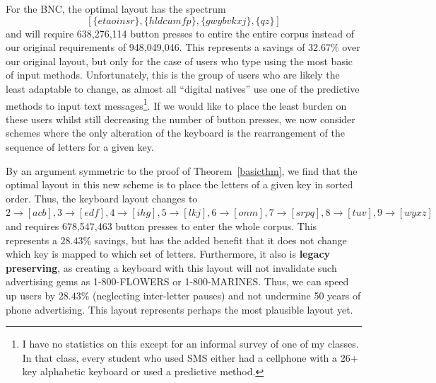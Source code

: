 \documentclass{article}
\newcommand{\newword}[1]{{\bf #1}}
\begin{document}
For the BNC, the optimal layout has the spectrum 
$$[\{etaoinsr\}, \{hldcumfp\}, \{gwybvkxj\}, \{qz\}]$$
and will require 638,276,114 button presses to
entire the entire corpus instead of our original requirements of
948,049,046.  This represents a savings of $32.67\%$ over our original
layout, but only for the case of users who type using the most basic of
input methods.  Unfortunately, this is the group of users who are likely
the least adaptable to change, as almost all ``digital natives'' use one of
the predictive methods to input text messages\footnote{I have no statistics
on this except for an informal survey of one of my classes.  In that
class, every student who used SMS either had a cellphone with a 26+
key alphabetic keyboard or used a predictive method.}.  If we would
like to place the least burden on these users whilst still
decreasing the number of button presses, we now consider schemes
where the only alteration of the keyboard is the rearrangement of
the sequence of letters for a given key.

By an argument symmetric to the proof of Theorem~\ref{basicthm}, we
find that the optimal layout in this new scheme is to place the letters of a
given key in sorted order.  Thus, the keyboard layout changes to $2\to[acb],
3\to[edf], 4\to[ihg], 5\to[lkj], 6\to[onm], 7\to[srpq],
8\to[tuv], 9\to[wyxz]$ and requires 678,547,463 button presses to
enter the whole corpus.  This represents a $28.43\%$ savings, but has the
added benefit that it does not change which key is mapped to which set of
letters.  Furthermore, it also is \newword{legacy preserving}, as
creating a keyboard with this layout will not invalidate such advertising
gems as 1-800-FLOWERS or 1-800-MARINES.  Thus, we can speed up users by
$28.43\%$ (neglecting inter-letter pauses) and not undermine 50 years of
phone advertising.  This layout represents perhaps the most plausible
layout yet.




\end{document}
